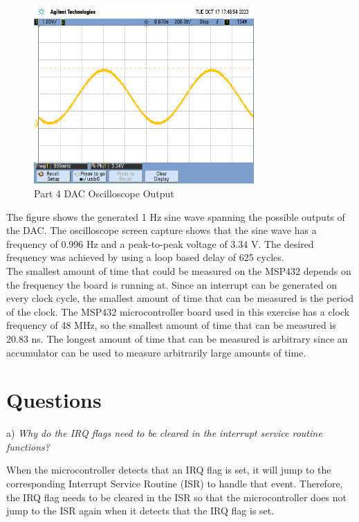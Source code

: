 \documentclass[CMPE]{KGCOEReport}
\begin{document}
\begin{figure}[H]
    \centering
    \includegraphics[width=0.75\textwidth]{part4.png}
    \caption{Part 4 DAC Oscilloscope Output}
    \label{fig:part4}
\end{figure}

The figure shows the generated 1 Hz sine wave spanning the possible outputs of the DAC. The oscilloscope screen capture shows that the sine wave has a frequency of 0.996 Hz and a peak-to-peak voltage of 3.34 V. The desired frequency was achieved by using a loop based delay of 625 cycles.\\

The smallest amount of time that could be measured on the MSP432 depends on the frequency the board is running at. Since an interrupt can be generated on every clock cycle, the smallest amount of time that can be measured is the period of the clock. The MSP432 microcontroller board used in this exercise has a clock frequency of 48 MHz, so the smallest amount of time that can be measured is 20.83 ns. The longest amount of time that can be measured is arbitrary since an accumulator can be used to measure arbitrarily large amounts of time.\\


\section*{Questions}

a) \emph{Why do the IRQ flags need to be cleared in the interrupt service routine functions?}

When the microcontroller detects that an IRQ flag is set, it will jump to the corresponding Interrupt Service Routine (ISR) to handle that event. Therefore, the IRQ flag needs to be cleared in the ISR so that the microcontroller does not jump to the ISR again when it detects that the IRQ flag is set.\\
\bigskip
\end{document}
